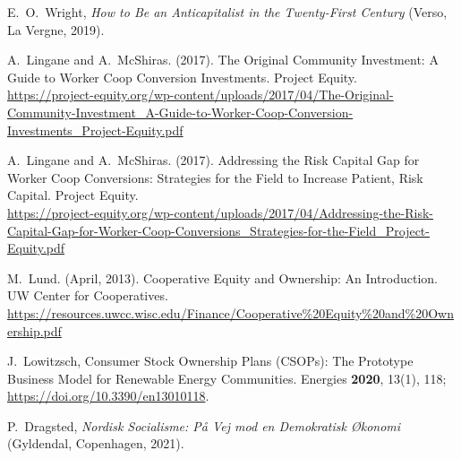 \documentclass{article}
\begin{document}

\begin{thebibliography}{20}
	
	
	E.\ O.\ Wright, 
	\textit{ How to Be an Anticapitalist in the Twenty-First Century} 
	(Verso, La Vergne, 2019).
	
	
%	
%	
	
	
	A.\ Lingane and A.\ McShiras.
	(2017). 
	The Original Community Investment: A Guide to Worker Coop Conversion Investments.
	Project Equity.\\
	\url{https://project-equity.org/wp-content/uploads/2017/04/The-Original-Community-Investment_A-Guide-to-Worker-Coop-Conversion-Investments_Project-Equity.pdf}
	
	
	A.\ Lingane and A.\ McShiras.
	(2017). 
	Addressing the Risk Capital Gap for Worker Coop Conversions: Strategies for the Field to Increase Patient, Risk Capital.
	Project Equity.\\
	\url{https://project-equity.org/wp-content/uploads/2017/04/Addressing-the-Risk-Capital-Gap-for-Worker-Coop-Conversions\_Strategies-for-the-Field\_Project-Equity.pdf}
	
	
	M.\ Lund.
	(April, 2013). 
	Cooperative Equity and Ownership: An Introduction.
	UW Center for Cooperatives.\\
	\url{https://resources.uwcc.wisc.edu/Finance/Cooperative%20Equity%20and%20Ownership.pdf}
	
	
	J.\ Lowitzsch, Consumer Stock Ownership Plans (CSOPs): The Prototype Business Model for Renewable Energy Communities. 
	Energies \textbf{2020}, 13(1), 118; \url{https://doi.org/10.3390/en13010118}.
	
	P.\ Dragsted, 
	\textit{Nordisk Socialisme: På Vej mod en Demokratisk Økonomi} 
	(Gyldendal, Copenhagen, 2021).
	
	
	
\end{thebibliography}
\end{document}
